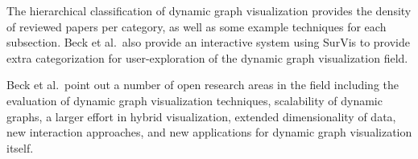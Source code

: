 The hierarchical classification of dynamic graph visualization provides the density of reviewed papers per category, as well as some example techniques for each subsection. Beck et al.\ also provide an interactive system using SurVis \cite{beck2016visual} to provide extra categorization for user-exploration of the dynamic graph visualization field.



Beck et al.\ point out a number of open research areas in the field including the evaluation of dynamic graph visualization techniques, scalability of dynamic graphs, a larger effort in hybrid visualization, extended dimensionality of data, new interaction approaches, and new applications for dynamic graph visualization itself.

